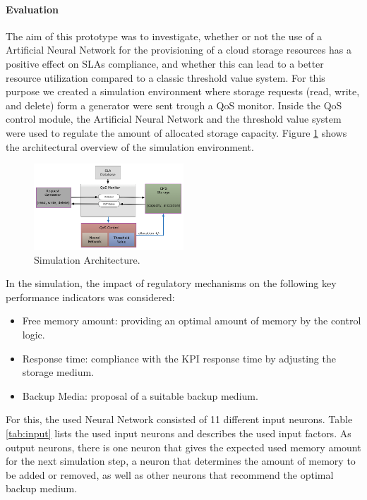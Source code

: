 \paragraph*{Evaluation}
The aim of this prototype was to investigate, whether or not the use of a Artificial Neural Network for the provisioning of a cloud storage resources has a positive effect on SLAs compliance, and whether this can lead to a better resource utilization compared to a classic threshold value system. For this purpose we created a simulation environment where storage requests (read, write, and delete) form a generator were sent trough a QoS monitor. Inside the QoS control module, the Artificial Neural Network and the threshold value system were used to regulate the amount of allocated storage capacity. Figure \ref{fig:arch} shows the architectural overview of the simulation environment.

\begin{figure}[ht]
	\begin{center}
		\includegraphics[width=0.5\textwidth]{fig/archi.png}
	\end{center}
	\caption{Simulation Architecture.}
	\label{fig:arch}
\end{figure}

In the simulation, the impact of regulatory mechanisms on the following key performance indicators was considered:
\begin{itemize}
	\item Free memory amount: providing an optimal amount of memory by the control logic. 
	\item Response time: compliance with the KPI response time by adjusting the storage medium. 
	\item Backup Media: proposal of a suitable backup medium.
\end{itemize}
For this, the used Neural Network consisted of  11 different input neurons. Table \ref{tab:input} lists the used input neurons and describes the used input factors. As output neurons, there is one neuron that gives the expected used memory amount for the next simulation step, a neuron that determines the amount of memory to be added or removed, as well as other neurons that recommend the optimal backup medium.

